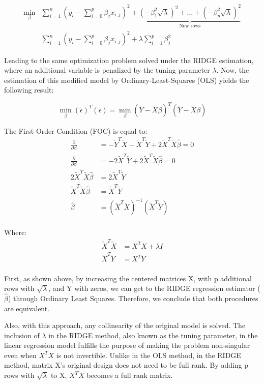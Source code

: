 \documentclass[12pt]{article}
\begin{document}
\begin{enumerate}
\begin{align*}
    \min_{\beta} &\sum_{i=1}^{n} \left( y_i - \sum_{i=0}^{p} \beta_j x_{i,j}  \right)^2 + \underbrace{(-\beta_1^2 \sqrt{\lambda})^2 + \dots + (-\beta_p^2 \sqrt{\lambda})^2}_{\text{New rows}}  \\
    &\sum_{i=1}^{n} \left( y_i - \sum_{i=0}^{p} \beta_j x_{i,j}  \right)^2 + \lambda \sum_{i=1}^{p} \beta_j^2 
\end{align*}

Leading to the same optimization problem solved under the RIDGE estimation, where an additional variable is penalized by the tuning parameter $\lambda$. Now, the estimation of this modified model by Ordinary-Least-Squares (OLS) yields the following result:

\[ \min_{\beta} (\tilde{\epsilon})^T(\tilde{\epsilon}) = \min_{\beta} (\tilde{Y}-\tilde{X}\beta)^T(\tilde{Y}-\tilde{X}\beta)\]

The First Order Condition (FOC) is equal to:
\begin{align*}
\frac{\partial}{\partial \beta} &= -\tilde{Y}^T\tilde{X} - \tilde{X}^T \tilde{Y} + 2 \tilde{X}^T \tilde{X}\hat\beta = 0 \\
\frac{\partial}{\partial \beta} &= -2\tilde{X}^T \tilde{Y} + 2 \tilde{X}^T \tilde{X}\hat\beta = 0 \\
2 \tilde{X}^T \tilde{X}\hat\beta &= 2\tilde{X}^T \tilde{Y}       \\
\tilde{X}^T \tilde{X}\hat\beta &= \tilde{X}^T \tilde{Y}       \\
\hat\beta &= (\tilde{X}^T \tilde{X})^{-1}(\tilde{X}^T \tilde{Y})     \\
\end{align*}

Where:
\begin{align*}
\tilde{X}^T\tilde{X} &= {X}^T{X} + \lambda I  \\
\tilde{X}^T\tilde{Y} &= {X}^T{Y}              \\
\end{align*}

First, as shown above, by increasing the centered matrices X, with p additional rows with $\sqrt{\lambda}$, and Y with zeros, we can get to the RIDGE regression estimator ($\hat\beta$) through Ordinary Least Squares. Therefore, we conclude that both procedures are equivalent. 

Also, with this approach, any collinearity of the original model is solved. The inclusion of $\lambda$ in the RIDGE method, also known as the tuning parameter, in the linear regression model fulfills the purpose of making the problem non-singular even when ${X}^T{X}$ is not invertible. Unlike in the OLS method, in the RIDGE method, matrix X's original design does not need to be full rank. By adding p rows with $\sqrt{\lambda}$ to X, ${X}^T{X}$ becomes a full rank matrix.


\end{enumerate}
\end{document}
